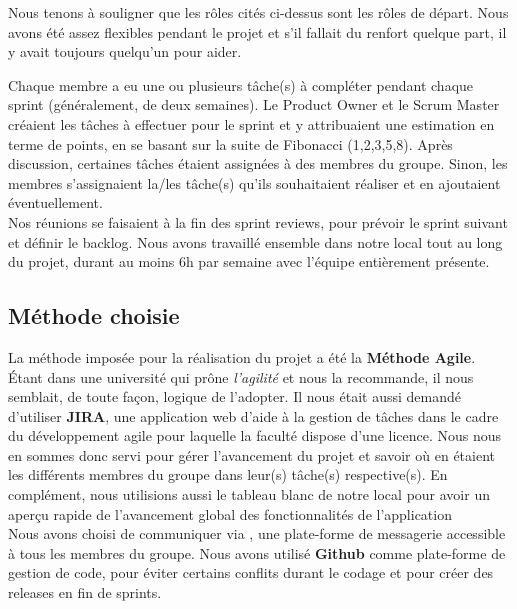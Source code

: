\documentclass[t, 12pt, usenames,dvipsnames]{article}
\begin{document}
            \noindent Nous tenons à souligner que les rôles cités ci-dessus sont les rôles de départ. Nous avons été assez flexibles pendant le projet et s'il fallait du renfort quelque part, il y avait toujours quelqu'un pour aider. 
            
            \newpage
            
            \noindent Chaque membre a eu une ou plusieurs tâche(s) à compléter pendant chaque sprint (généralement, de deux semaines). Le Product Owner et le Scrum Master créaient les tâches à effectuer pour le sprint et y attribuaient une estimation en terme de points, en se basant sur la suite de Fibonacci (1,2,3,5,8). Après discussion, certaines tâches étaient assignées à des membres du groupe. Sinon, les membres s'assignaient la/les tâche(s) qu'ils souhaitaient réaliser et en ajoutaient éventuellement.\\
            Nos réunions se faisaient à la fin des sprint reviews, pour prévoir le sprint suivant et définir le backlog. Nous avons travaillé ensemble dans notre local tout au long du projet, durant au moins 6h par semaine avec l'équipe entièrement présente.
            
        \subsection{Méthode choisie}
            \noindent La méthode imposée pour la réalisation du projet a été la \textbf{Méthode Agile}. Étant dans une université qui prône \textit{l'agilité} et nous la recommande, il nous semblait, de toute façon, logique de l'adopter. Il nous était aussi demandé d'utiliser \textbf{JIRA}, une application web d'aide à la gestion de tâches dans le cadre du développement agile pour laquelle la faculté dispose d'une licence. Nous nous en sommes donc servi pour gérer l'avancement du projet et savoir où en étaient les différents membres du groupe dans leur(s) tâche(s) respective(s). En complément, nous utilisions aussi le tableau blanc de notre local pour avoir un aperçu rapide de l'avancement global des fonctionnalités de l'application \\
            Nous avons choisi de communiquer via , une plate-forme de messagerie accessible à tous les membres du groupe. Nous avons utilisé \textbf{Github} comme plate-forme de gestion de code, pour éviter certains conflits durant le codage et pour créer des releases en fin de sprints.\\
            
\end{document}
